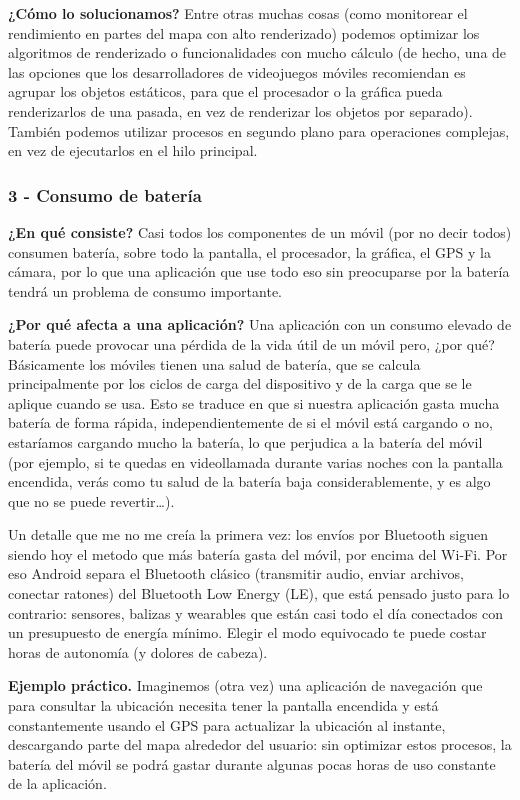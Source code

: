 \documentclass[11pt,a4paper]{article}
\newcommand{\campo}[1]{\textbf{\color{navy}#1}}
\begin{document}
	\campo{¿Cómo lo solucionamos?}
	Entre otras muchas cosas (como monitorear el rendimiento en partes del mapa con alto renderizado) podemos optimizar los algoritmos de renderizado o funcionalidades con mucho cálculo (de hecho, una de las opciones que los desarrolladores de videojuegos móviles recomiendan es agrupar los objetos estáticos, para que el procesador o la gráfica pueda renderizarlos de una pasada, en vez de renderizar los objetos por separado). También podemos utilizar procesos en segundo plano para operaciones complejas, en vez de ejecutarlos en el hilo principal.
	
	\subsubsection*{3 - Consumo de batería}
	
	\campo{¿En qué consiste?}
	Casi todos los componentes de un móvil (por no decir todos) consumen batería, sobre todo la pantalla, el procesador, la gráfica, el GPS y la cámara, por lo que una aplicación que use todo eso sin preocuparse por la batería tendrá un problema de consumo importante.
	
	\campo{¿Por qué afecta a una aplicación?}
	Una aplicación con un consumo elevado de batería puede provocar una pérdida de la vida útil de un móvil pero, ¿por qué? Básicamente los móviles tienen una salud de batería, que se calcula principalmente por los ciclos de carga del dispositivo y de la carga que se le aplique cuando se usa. Esto se traduce en que si nuestra aplicación gasta mucha batería de forma rápida, independientemente de si el móvil está cargando o no, estaríamos cargando mucho la batería, lo que perjudica a la batería del móvil (por ejemplo, si te quedas en videollamada durante varias noches con la pantalla encendida, verás como tu salud de la batería baja considerablemente, y es algo que no se puede revertir\ldots).
	
	Un detalle que me no me creía la primera vez: los envíos por Bluetooth siguen siendo hoy el metodo que más batería gasta del móvil, por encima del Wi-Fi. Por eso Android separa el Bluetooth clásico (transmitir audio, enviar archivos, conectar ratones) del Bluetooth Low Energy (LE), que está pensado justo para lo contrario: sensores, balizas y wearables que están casi todo el día conectados con un presupuesto de energía mínimo. Elegir el modo equivocado te puede costar horas de autonomía (y dolores de cabeza).
	
	\campo{Ejemplo práctico.}
	Imaginemos (otra vez) una aplicación de navegación que para consultar la ubicación necesita tener la pantalla encendida y está constantemente usando el GPS para actualizar la ubicación al instante, descargando parte del mapa alrededor del usuario: sin optimizar estos procesos, la batería del móvil se podrá gastar durante algunas pocas horas de uso constante de la aplicación.
	
\end{document}
